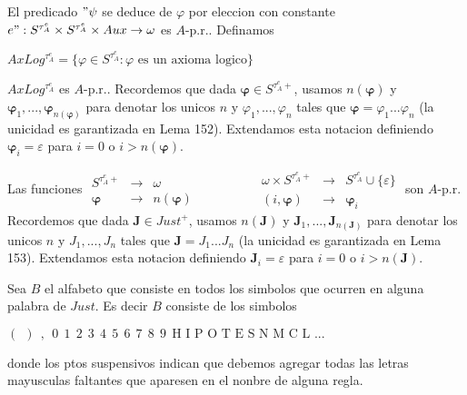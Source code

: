   \begin{lemma}
    El predicado \("\psi \) se deduce de \(\varphi \) por eleccion con constante \( e":S^{\tau _{A}^{e}}\times S^{\tau _{A}^{e}}\times Aux\rightarrow \omega \) es \(A\)-p.r..
    Definamos

    \(\displaystyle AxLog^{\tau _{A}^{e}}=\{\varphi \in S^{\tau _{A}^{e}}:\varphi \text{ es un axioma logico}\} \)
  \end{lemma}

  \begin{lemma}
    \(AxLog^{\tau _{A}^{e}}\) es \(A\)-p.r..
    Recordemos que dada \(\mathbf{\varphi }\in S^{\tau _{A}^{e}+}\), usamos \(n( \mathbf{\varphi })\) y \(\mathbf{\varphi }_{1},...,\mathbf{\varphi }_{n( \mathbf{\varphi })}\) para denotar los unicos \(n\) y \(\varphi _{1},...,\varphi _{n}\) tales que \(\mathbf{\varphi }=\varphi _{1}...\varphi _{n}\) (la unicidad es garantizada en Lema 152). Extendamos esta notacion definiendo \(\mathbf{\varphi }_{i}=\varepsilon \) para \(i=0\) o \(i >n( \mathbf{\varphi })\).
  \end{lemma}

  \begin{lemma}
    Las funciones
    \(\displaystyle \begin{array}{ccc} S^{\tau _{A}^{e}+} & \rightarrow & \omega \\ \mathbf{\varphi } & \rightarrow & n(\mathbf{\varphi }) \end{array} \ \ \ \ \ \ \ \ \ \ \ \ \ \ \ \ \ \ \ \ \ \begin{array}{ccc} \omega \times S^{\tau _{A}^{e}+} & \rightarrow & S^{\tau _{A}^{e}}\cup \{\varepsilon \} \\ (i,\mathbf{\varphi }) & \rightarrow & \mathbf{\varphi }_{i} \end{array} \)
    son \(A\)-p.r.
    Recordemos que dada \(\mathbf{J}\in Just^{+}\), usamos \(n(\mathbf{J})\) y \( \mathbf{J}_{1},...,\mathbf{J}_{n(\mathbf{J})}\) para denotar los unicos \(n\) y \(J_{1},...,J_{n}\) tales que \(\mathbf{J}=J_{1}...J_{n}\) (la unicidad es garantizada en Lema 153). Extendamos esta notacion definiendo \(\mathbf{J}_{i}=\varepsilon \) para \(i=0\) o \(i >n(\mathbf{J })\).

    Sea \(B\) el alfabeto que consiste en todos los simbolos que ocurren en alguna palabra de \(Just\). Es decir \(B\) consiste de los simbolos

    \(\displaystyle (\ \ )\ \ ,\ \ 0\ \ 1\ \ 2\ \ 3\ \ 4\ \ 5\ \ 6\ \ 7\ \ 8\ \ 9\ \ \text{H I P O T E S N M C L }... \)

    donde los ptos suspensivos indican que debemos agregar todas las letras mayusculas faltantes que aparesen en el nonbre de alguna regla.
  \end{lemma}

